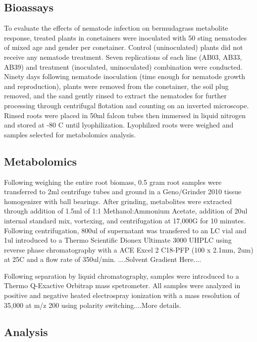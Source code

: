 \documentclass[9pt,lineno]{elife}
\begin{document}
\subsection{Bioassays}

To evaluate the effects of nematode infection on bermudagrass metabolite response, treated plants in conetainers were inoculated with 50 sting nematodes of mixed age and gender per conetainer.  Control (uninoculated) plants did not receive any nematode treatment. Seven replications of each line (AB03, AB33, AB39) and treatment (inoculated, uninoculated) combination were conducted.  Ninety days following nematode inoculation (time enough for nematode growth and reproduction), plants were removed from the conetainer, the soil plug removed, and the sand gently rinsed to extract the nematodes for further processing through centrifugal flotation and counting on an inverted microscope.  Rinsed roots were placed in 50ml falcon tubes then immersed in liquid nitrogen and stored at -80 C until lyophilization.  Lyophilzed roots were weighed and samples selected for metabolomics analysis. 

\subsection{Metabolomics}

Following weighing the entire root biomass, 0.5 gram root samples were transferred to 2ml centrifuge tubes and ground in a Geno/Grinder 2010 tissue homogenizer with ball bearings.  After grinding, metabolites were extracted through addition of 1.5ml of 1:1 Methanol:Ammonium Acetate, addition of 20ul internal standard mix, vortexing, and centrifugation at 17,000G for 10 minutes.  Following centrifugation, 800ul of supernatant was transfered to an LC vial and 1ul introduced to a Thermo Scientific Dionex Ultimate 3000 UHPLC using reverse phase chromatography with a ACE Excel 2 C18-PFP (100 x 2.1mm, 2um) at 25C and a flow rate of 350ul/min.  ....Solvent Gradient Here.... 

Following separation by liquid chromatography, samples were introduced to a Thermo Q-Exactive Orbitrap mass spetrometer.  All samples were analyzed in positive and negative heated electrospray ionization with a mass resolution of 35,000 at m/z 200 using polarity switching....More details.  


\subsection{Analysis}
\end{document}
